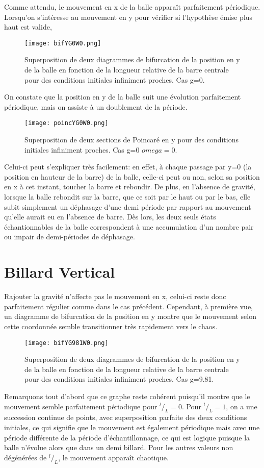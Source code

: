 \documentclass[a4paper]{report}
\begin{document}
Comme attendu, le mouvement en x de la balle apparaît parfaitement périodique. Lorsqu'on s'intéresse au mouvement en y pour vérifier si l'hypothèse émise plus haut est valide,
\begin{figure}[h!]
   \texttt{[image: bifYG0W0.png]}
      \caption[Diagramme de bifurcation en y: g=0 ]{Superposition de deux diagrammes de bifurcation de la position en y de la balle en fonction de la longueur relative de la barre centrale pour des conditions initiales infiniment proches. Cas g=0.}
\end{figure}
On constate que la position en y de la balle suit une évolution parfaitement périodique, mais on assiste à un doublement de la période.
\begin{figure}[H]
   \texttt{[image: poincYG0W0.png]}
      \caption[Section de Poincaré en y: g=0 ]{Superposition de deux sections de Poincaré en y pour des conditions initiales infiniment proches. Cas g=0 \(omega=0\).}
\end{figure}

Celui-ci peut s'expliquer très facilement: en effet, à chaque passage par y=0 (la position en hauteur de la barre) de la balle, celle-ci peut ou non, selon sa position en x à cet instant, toucher la barre et rebondir. De plus, en l'absence de gravité, lorsque la balle rebondit sur la barre, que ce soit par le haut ou par le bas, elle subit simplement un déphasage d'une demi période par rapport au mouvement qu'elle aurait eu en l'absence de barre. Dès lors, les deux seuls états échantionnables de la balle correspondent à une accumulation d'un nombre pair ou impair de demi-périodes de déphasage.

\section{Billard Vertical}
\label{sec:billVert}
Rajouter la gravité n'affecte pas le mouvement en x, celui-ci reste donc parfaitement régulier comme dans le cas précédent. Cependant, à première vue, un diagramme de bifurcation de la position en y montre que le mouvement selon cette coordonnée semble transitionner très rapidement vers le chaos.
\begin{figure}[h!]
   \texttt{[image: bifYG981W0.png]}
      \caption[Diagramme de Bifurcation en y: g=9.81 \(\omega=0\)]{Superposition de deux diagrammes de bifurcation de la position en y de la balle en fonction de la longueur relative de la barre centrale pour des conditions initiales infiniment proches. Cas g=9.81.}
\end{figure}
Remarquons tout d'abord que ce graphe reste cohérent puisqu'il montre que le mouvement semble parfaitement périodique pour \(^l/_L=0\). Pour \(^l/_L=1\), on a une succession continue de points, avec superposition parfaite des deux conditions initiales, ce qui signifie que le mouvement est également périodique mais avec une période différente de la période d'échantillonnage, ce qui est logique puisque la balle n'évolue alors que dans un demi billard. Pour les autres valeurs non dégénérées de \(^l/_L\), le mouvement apparaît chaotique.
\end{document}
